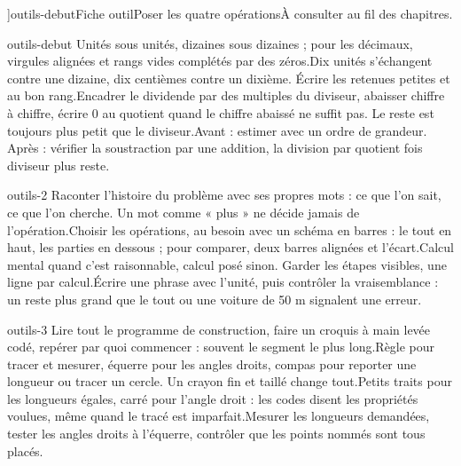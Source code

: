 \editionPage[\pdfbookmark[0]{Fiches outils}{bm-outils-debut-parent}]{outils-debut}{Fiche outil}{Poser les quatre opérations}{À consulter au fil des chapitres.}
\begin{blocEdition}{outils-debut}
Unités sous unités, dizaines sous dizaines ; pour les décimaux, virgules alignées et rangs vides complétés par des zéros.Dix unités s’échangent contre une dizaine, dix centièmes contre un dixième. Écrire les retenues petites et au bon rang.Encadrer le dividende par des multiples du diviseur, abaisser chiffre à chiffre, écrire 0 au quotient quand le chiffre abaissé ne suffit pas. Le reste est toujours plus petit que le diviseur.Avant : estimer avec un ordre de grandeur. Après : vérifier la soustraction par une addition, la division par quotient fois diviseur plus reste.
\end{blocEdition}
\begin{blocEdition}{outils-2}
Raconter l’histoire du problème avec ses propres mots : ce que l’on sait, ce que l’on cherche. Un mot comme « plus » ne décide jamais de l’opération.Choisir les opérations, au besoin avec un schéma en barres : le tout en haut, les parties en dessous ; pour comparer, deux barres alignées et l’écart.Calcul mental quand c’est raisonnable, calcul posé sinon. Garder les étapes visibles, une ligne par calcul.Écrire une phrase avec l’unité, puis contrôler la vraisemblance : un reste plus grand que le tout ou une voiture de 50 m signalent une erreur.
\end{blocEdition}
\begin{blocEdition}{outils-3}
Lire tout le programme de construction, faire un croquis à main levée codé, repérer par quoi commencer : souvent le segment le plus long.Règle pour tracer et mesurer, équerre pour les angles droits, compas pour reporter une longueur ou tracer un cercle. Un crayon fin et taillé change tout.Petits traits pour les longueurs égales, carré pour l’angle droit : les codes disent les propriétés voulues, même quand le tracé est imparfait.Mesurer les longueurs demandées, tester les angles droits à l’équerre, contrôler que les points nommés sont tous placés.
\end{blocEdition}
